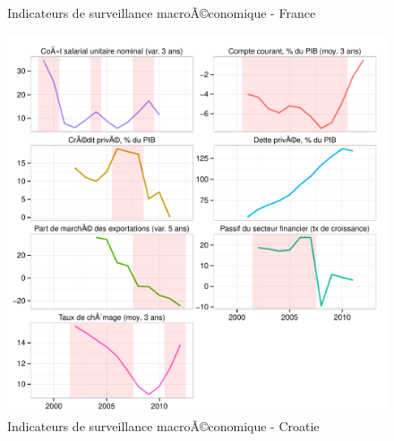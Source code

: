 \documentclass{article}\usepackage[]{graphicx}\usepackage[]{color}
\makeatletter
\def\maxwidth{ %
  \ifdim\Gin@nat@width>\linewidth
    \linewidth
  \else
    \Gin@nat@width
  \fi
}
\newenvironment{knitrout}{}{} %
\makeatother
\begin{document}
\begin{knitrout}
\begin{figure}[p]
{}

\caption[Indicateurs de surveillance macroÃ©conomique - France]{Indicateurs de surveillance macroÃ©conomique - France\label{fig:byco12}}
\end{figure}

\begin{figure}[p]


{\centering \includegraphics[width=\maxwidth]{figure_graph/byco13} 

}

\caption[Indicateurs de surveillance macroÃ©conomique - Croatie]{Indicateurs de surveillance macroÃ©conomique - Croatie\label{fig:byco13}}
\end{figure}

\begin{figure}[p]



\end{figure}
\end{knitrout}
\end{document}
